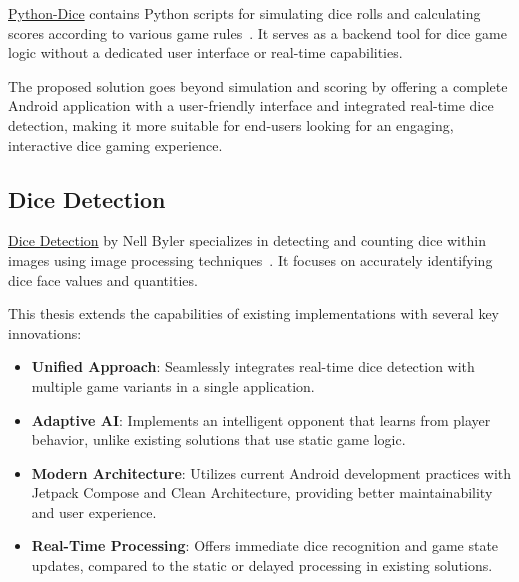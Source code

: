 \href{https://github.com/jckuhl/Python-Dice}{Python-Dice} contains Python scripts for simulating dice rolls and calculating scores according to various game rules~\cite{bib:python-dice}. It serves as a backend tool for dice game logic without a dedicated user interface or real-time capabilities.

The proposed solution goes beyond simulation and scoring by offering a complete Android application with a user-friendly interface and integrated real-time dice detection, making it more suitable for end-users looking for an engaging, interactive dice gaming experience.

\subsection{Dice Detection}

\href{https://github.com/binaryshrey/Dice}{Dice Detection} by Nell Byler specializes in detecting and counting dice within images using image processing techniques~\cite{bib:nell-byler}. It focuses on accurately identifying dice face values and quantities.

This thesis extends the capabilities of existing implementations with several key innovations:

\begin{itemize}
    \item \textbf{Unified Approach}: Seamlessly integrates real-time dice detection with multiple game variants in a single application.
    
    \item \textbf{Adaptive AI}: Implements an intelligent opponent that learns from player behavior, unlike existing solutions that use static game logic.
    
    \item \textbf{Modern Architecture}: Utilizes current Android development practices with Jetpack Compose and Clean Architecture, providing better maintainability and user experience.
    
    \item \textbf{Real-Time Processing}: Offers immediate dice recognition and game state updates, compared to the static or delayed processing in existing solutions.
\end{itemize}
